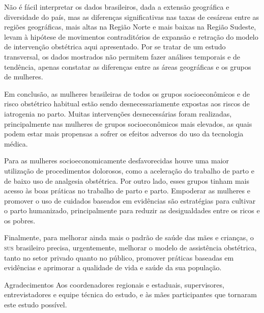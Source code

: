\documentclass{article}
\begin{document}
Não é fácil interpretar os dados brasileiros, dada a extensão geográfica e
diversidade do país, mas as diferenças significativas nas taxas de cesáreas
entre as
regiões geográficas, mais altas na Região Norte e mais baixas na Região Sudeste,
levam à hipótese de movimentos contraditórios de expansão e retração do modelo
de
intervenção obstétrica aqui apresentado. Por se tratar de um estudo transversal,
os
dados mostrados não permitem fazer análises temporais e de tendência, apenas
constatar as diferenças entre as áreas geográficas e os grupos de mulheres.

Em conclusão, as mulheres brasileiras de todos os grupos socioeconômicos e de
risco
obstétrico habitual estão sendo desnecessariamente expostas aos riscos de
iatrogenia
no parto. Muitas intervenções desnecessárias foram realizadas, principalmente
nas
mulheres de grupos socioeconômicos mais elevados, as quais podem estar mais
propensas a sofrer os efeitos adversos do uso da tecnologia médica.

Para as mulheres socioeconomicamente desfavorecidas houve uma maior utilização
de
procedimentos dolorosos, como a aceleração do trabalho de parto e de baixo uso
de
analgesia obstétrica. Por outro lado, esses grupos tinham mais acesso às boas
práticas no trabalho de parto e parto. Empoderar as mulheres e promover o uso de
cuidados baseados em evidências são estratégias para cultivar o parto
humanizado,
principalmente para reduzir as desigualdades entre os ricos e os pobres.

Finalmente, para melhorar ainda mais o padrão de saúde das mães e crianças, o
\textsc{sus}
brasileiro precisa, urgentemente, melhorar o modelo de assistência obstétrica,
tanto
no setor privado quanto no público, promover práticas baseadas em evidências e
aprimorar a qualidade de vida e saúde da sua população.

Agradecimentos
Aos coordenadores regionais e estaduais, supervisores, entrevistadores e equipe
técnica do estudo, e às mães participantes que tornaram este estudo possível.
\end{document}
